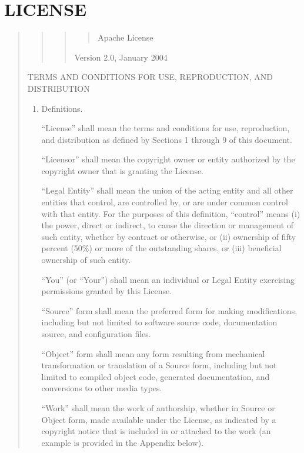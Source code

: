 \documentclass[letterpaper,10pt,english,openany,oneside]{sphinxmanual}
\begin{document}
\chapter{LICENSE}
\label{\detokenize{license:license}}\label{\detokenize{license::doc}}\begin{quote}
\begin{quote}
\begin{quote}
\begin{quote}

Apache License
\end{quote}

Version 2.0, January 2004
\end{quote}

\end{quote}

TERMS AND CONDITIONS FOR USE, REPRODUCTION, AND DISTRIBUTION
\begin{enumerate}
%
\item {} 
Definitions.

“License” shall mean the terms and conditions for use, reproduction,
and distribution as defined by Sections 1 through 9 of this document.

“Licensor” shall mean the copyright owner or entity authorized by
the copyright owner that is granting the License.

“Legal Entity” shall mean the union of the acting entity and all
other entities that control, are controlled by, or are under common
control with that entity. For the purposes of this definition,
“control” means (i) the power, direct or indirect, to cause the
direction or management of such entity, whether by contract or
otherwise, or (ii) ownership of fifty percent (50\%) or more of the
outstanding shares, or (iii) beneficial ownership of such entity.

“You” (or “Your”) shall mean an individual or Legal Entity
exercising permissions granted by this License.

“Source” form shall mean the preferred form for making modifications,
including but not limited to software source code, documentation
source, and configuration files.

“Object” form shall mean any form resulting from mechanical
transformation or translation of a Source form, including but
not limited to compiled object code, generated documentation,
and conversions to other media types.

“Work” shall mean the work of authorship, whether in Source or
Object form, made available under the License, as indicated by a
copyright notice that is included in or attached to the work
(an example is provided in the Appendix below).


\end{enumerate}
\end{quote}
\end{document}
